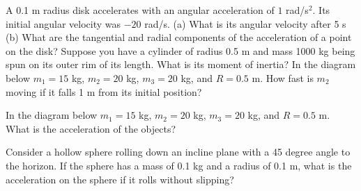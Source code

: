 \documentclass[12pt]{article}
\begin{document}
\pagestyle{empty}
\noindent A 0.1 m radius disk accelerates with an angular acceleration of $1$ rad/s$^2$.  Its initial angular velocity was $-20$ rad/s. (a) What is its angular velocity after 5 s (b) What are the tangential and radial components of the acceleration of a point on the disk? 
\newpage
\noindent Suppose you have a cylinder of radius 0.5 m and mass 1000 kg being spun on its outer rim of its length.  What is its moment of inertia? 
\newpage
\noindent In the diagram below $m_1=15$ kg, $m_2 = 20$ kg, $m_3=20$ kg, and $R=0.5$ m.  How fast is $m_2$ moving if it falls 1 m from its initial position?

\resizebox{3cm}{!}{}
\newpage
\noindent \noindent In the diagram below $m_1=15$ kg, $m_2 = 20$ kg, $m_3=20$ kg, and $R=0.5$ m.  What is the acceleration of the objects?

\resizebox{3cm}{!}{}

\newpage
\noindent Consider a hollow sphere rolling down an incline plane with a 45 degree angle to the horizon.  If the sphere has a mass of 0.1 kg and a radius of 0.1 m, what is the acceleration on the sphere if it rolls without slipping?
\end{document}

